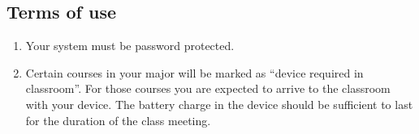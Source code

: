 \subsection*{Terms of use}

\begin{enumerate}
    \item Your system must be password protected.
    
    \item Certain courses in your major will be marked as ``device required in classroom''. For those courses you are expected to arrive to the classroom with your device. The battery charge in the device should be sufficient to last for the duration of the class meeting.

\end{enumerate}
